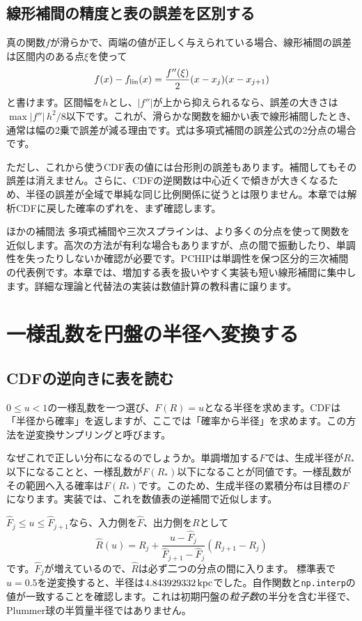 \subsection{線形補間の精度と表の誤差を区別する}
真の関数$f$が滑らかで、両端の値が正しく与えられている場合、線形補間の誤差は区間内のある点$\xi$を使って
\begin{equation}
f(x)-f_{\rm lin}(x)=\frac{f''(\xi)}{2}(x-x_j)(x-x_{j+1})
\label{eq:ch4-interpolation-error}
\end{equation}
と書けます。区間幅を$h$とし、$|f''|$が上から抑えられるなら、誤差の大きさは$\max|f''|\,h^2/8$以下です。これが、滑らかな関数を細かい表で線形補間したとき、通常は幅の2乗で誤差が減る理由です。式は多項式補間の誤差公式の2分点の場合です。\cite{sugiura2009}

ただし、これから使うCDF表の値には台形則の誤差もあります。補間してもその誤差は消えません。さらに、CDFの逆関数は中心近くで傾きが大きくなるため、半径の誤差が全域で単純な同じ比例関係に従うとは限りません。本章では解析CDFに戻した確率のずれを、まず確認します。

\begin{notebox}{ほかの補間法}
多項式補間や三次スプラインは、より多くの分点を使って関数を近似します。高次の方法が有利な場合もありますが、点の間で振動したり、単調性を失ったりしないか確認が必要です。PCHIPは単調性を保つ区分的三次補間の代表例です。\cite{scipy_pchip}本章では、増加する表を扱いやすく実装も短い線形補間に集中します。詳細な理論と代替法の実装は数値計算の教科書に譲ります。
\end{notebox}

\section{一様乱数を円盤の半径へ変換する}
\label{sec:ch4-sampling}
\subsection{CDFの逆向きに表を読む}
$0\le u<1$の一様乱数を一つ選び、$F(R)=u$となる半径を求めます。CDFは「半径から確率」を返しますが、ここでは「確率から半径」を求めます。この方法を逆変換サンプリングと呼びます。\cite{irifuji1985}

なぜこれで正しい分布になるのでしょうか。単調増加する$F$では、生成半径が$R_*$以下になることと、一様乱数が$F(R_*)$以下になることが同値です。一様乱数がその範囲へ入る確率は$F(R_*)$です。このため、生成半径の累積分布は目標の$F$になります。実装では、これを数値表の逆補間で近似します。

$\widehat F_j\le u\le\widehat F_{j+1}$なら、入力側を$\widehat F$、出力側を$R$として
\begin{equation}
\widehat R(u)=R_j+
\frac{u-\widehat F_j}{\widehat F_{j+1}-\widehat F_j}(R_{j+1}-R_j)
\label{eq:ch4-inverse-interpolation}
\end{equation}
です。$\widehat F_j$が増えているので、$\widehat R$は必ず二つの分点の間に入ります。
標準表で$u=0.5$を逆変換すると、半径は$4.843929332\,\mathrm{kpc}$でした。自作関数と\texttt{np.interp}の値が一致することを確認します。これは初期円盤の\emph{粒子数}の半分を含む半径で、Plummer球の半質量半径ではありません。

